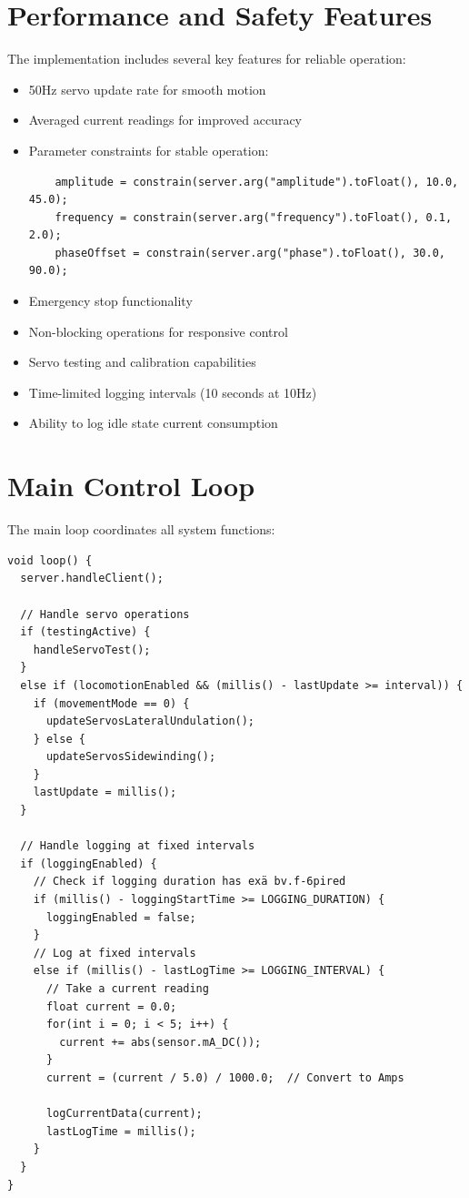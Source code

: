 \documentclass[12pt,a4paper]{report}
\begin{document}
\section{Performance and Safety Features}
The implementation includes several key features for reliable operation:

\begin{itemize}
    \item 50Hz servo update rate for smooth motion
    \item Averaged current readings for improved accuracy
    \item Parameter constraints for stable operation:
    \begin{verbatim}
    amplitude = constrain(server.arg("amplitude").toFloat(), 10.0, 45.0);
    frequency = constrain(server.arg("frequency").toFloat(), 0.1, 2.0);
    phaseOffset = constrain(server.arg("phase").toFloat(), 30.0, 90.0);
    \end{verbatim}
    \item Emergency stop functionality
    \item Non-blocking operations for responsive control
    \item Servo testing and calibration capabilities
    \item Time-limited logging intervals (10 seconds at 10Hz)
    \item Ability to log idle state current consumption
\end{itemize}

\section{Main Control Loop}
The main loop coordinates all system functions:

\begin{verbatim}
void loop() {
  server.handleClient();
  
  // Handle servo operations
  if (testingActive) {
    handleServoTest();
  }
  else if (locomotionEnabled && (millis() - lastUpdate >= interval)) {
    if (movementMode == 0) {
      updateServosLateralUndulation();
    } else {
      updateServosSidewinding();
    }
    lastUpdate = millis();
  }
  
  // Handle logging at fixed intervals
  if (loggingEnabled) {
    // Check if logging duration has exä bv.f-6pired
    if (millis() - loggingStartTime >= LOGGING_DURATION) {
      loggingEnabled = false;
    } 
    // Log at fixed intervals
    else if (millis() - lastLogTime >= LOGGING_INTERVAL) {
      // Take a current reading
      float current = 0.0;
      for(int i = 0; i < 5; i++) {
        current += abs(sensor.mA_DC());
      }
      current = (current / 5.0) / 1000.0;  // Convert to Amps
      
      logCurrentData(current);
      lastLogTime = millis();
    }
  }
}
\end{verbatim}

\printbibliography
\end{document}
